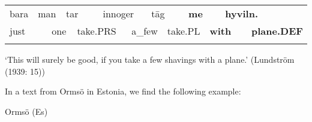 \begin{tabular}{llllllllllllll}
\lsptoprule
bara & \multicolumn{2}{l}{man

} & \multicolumn{2}{l}{tar

} & \multicolumn{2}{l}{innoger

} & \multicolumn{2}{l}{t\=ag

} & \multicolumn{2}{l}{{\bfseries me}

} & \multicolumn{2}{l}{{\bfseries hyviln.}

} & \\
\multicolumn{2}{l}{just

} & \multicolumn{2}{l}{one

} & \multicolumn{2}{l}{take.PRS

} & \multicolumn{2}{l}{a\_few

} & \multicolumn{2}{l}{take.PL

} & \multicolumn{2}{l}{{\bfseries with}

} & \multicolumn{2}{l}{{\bfseries plane.DEF}

}\\
\lspbottomrule
\end{tabular}

\begin{styleTranslation}
‘This will surely be good, if you take a few shavings with a plane.’ (Lundström (1939: 15))

\end{styleTranslation}

\begin{styleBodyTextFirst}
In a text from Ormsö in Estonia, we find the following example:

\end{styleBodyTextFirst}


\begin{listWWNumileveli}
\item {}

\begin{styleExample}
Ormsö (Es)

\end{styleExample}

\end{listWWNumileveli}

